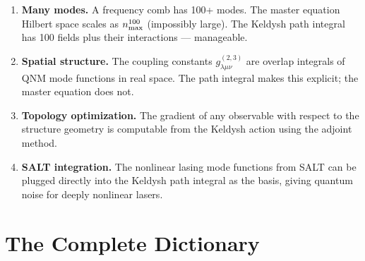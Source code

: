 \documentclass[12pt]{article}
\begin{document}
\begin{enumerate}[leftmargin=1.5em]
  \item \textbf{Many modes.} A frequency comb has 100+ modes.
    The master equation Hilbert space scales as $n_{\rm max}^{100}$
    (impossibly large). The Keldysh path integral has 100 fields
    plus their interactions --- manageable.

  \item \textbf{Spatial structure.} The coupling constants
    $g^{(2,3)}_{\lambda\mu\nu}$ are overlap integrals of QNM mode
    functions in real space. The path integral makes this explicit;
    the master equation does not.

  \item \textbf{Topology optimization.} The gradient of any observable
    with respect to the structure geometry is computable from the
    Keldysh action using the adjoint method.

  \item \textbf{SALT integration.} The nonlinear lasing mode functions
    from SALT can be plugged directly into the Keldysh path integral
    as the basis, giving quantum noise for deeply nonlinear lasers.
\end{enumerate}

\section{The Complete Dictionary}
\end{document}
